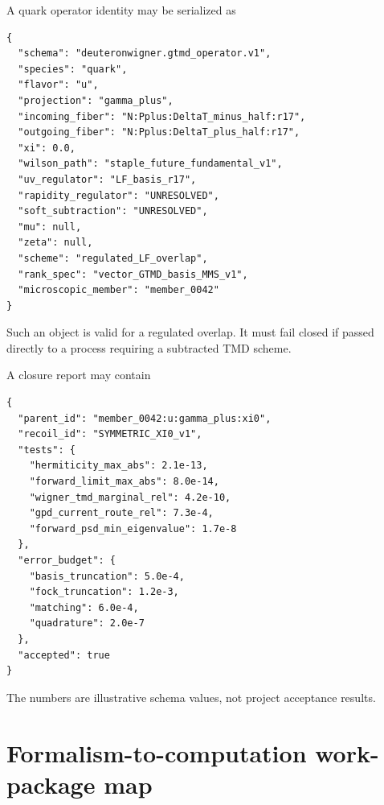 \documentclass[11pt]{article}
\begin{document}
A quark operator identity may be serialized as
\begin{verbatim}
{
  "schema": "deuteronwigner.gtmd_operator.v1",
  "species": "quark",
  "flavor": "u",
  "projection": "gamma_plus",
  "incoming_fiber": "N:Pplus:DeltaT_minus_half:r17",
  "outgoing_fiber": "N:Pplus:DeltaT_plus_half:r17",
  "xi": 0.0,
  "wilson_path": "staple_future_fundamental_v1",
  "uv_regulator": "LF_basis_r17",
  "rapidity_regulator": "UNRESOLVED",
  "soft_subtraction": "UNRESOLVED",
  "mu": null,
  "zeta": null,
  "scheme": "regulated_LF_overlap",
  "rank_spec": "vector_GTMD_basis_MMS_v1",
  "microscopic_member": "member_0042"
}
\end{verbatim}
Such an object is valid for a regulated overlap.  It must fail closed if
passed directly to a process requiring a subtracted TMD scheme.

A closure report may contain
\begin{verbatim}
{
  "parent_id": "member_0042:u:gamma_plus:xi0",
  "recoil_id": "SYMMETRIC_XI0_v1",
  "tests": {
    "hermiticity_max_abs": 2.1e-13,
    "forward_limit_max_abs": 8.0e-14,
    "wigner_tmd_marginal_rel": 4.2e-10,
    "gpd_current_route_rel": 7.3e-4,
    "forward_psd_min_eigenvalue": 1.7e-8
  },
  "error_budget": {
    "basis_truncation": 5.0e-4,
    "fock_truncation": 1.2e-3,
    "matching": 6.0e-4,
    "quadrature": 2.0e-7
  },
  "accepted": true
}
\end{verbatim}
The numbers are illustrative schema values, not project acceptance results.

\section{Formalism-to-computation work-package map}
\label{app:work-packages}
\end{document}
